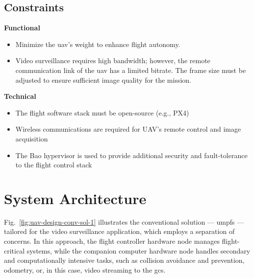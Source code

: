 \subsection{Constraints}
\label{sec:constr}

\textbf{Functional}
\begin{itemize}
    \item Minimize the \gls{uav}'s weight to enhance flight autonomy.
    \item Video surveillance requires high bandwidth; however, the remote
communication link of the \gls{uav} has a limited bitrate. The frame size must
be adjusted to ensure sufficient image quality for the mission. 
\end{itemize}


\textbf{Technical}
  \begin{itemize}
    \item The flight software stack must be open-source (e.g., PX4)
    \item Wireless communications are required for UAV's remote control and
image acquisition
\item The Bao hypervisor is used to provide additional security and
fault-tolerance to the flight control stack
    \end{itemize}

\section{System Architecture}
\label{sec:design-sysArch}
Fig.~\ref{fig:uav-design-conv-sol-1} illustrates the conventional solution ---
\gls{umpfs} --- tailored for the video surveillance application, which employs a
separation of concerns. In this approach, the flight controller hardware node
manages flight-critical systems, while the companion computer hardware node
handles secondary and computationally intensive tasks, such as collision
avoidance and prevention, odometry, or, in this case, video streaming to the
\gls{gcs}.

